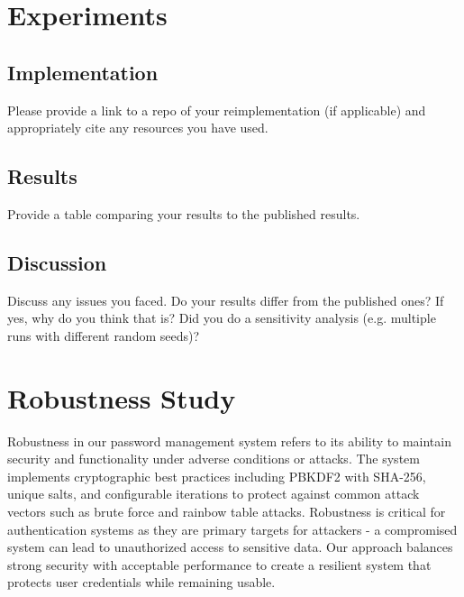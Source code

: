 \documentclass[11pt,a4paper]{article}
\begin{document}
\section{Experiments}

\subsection{Implementation} 
Please provide a link to a repo of your reimplementation (if applicable) and appropriately cite any resources you have used.

\subsection{Results}
Provide a table comparing your results to the published results.

\subsection{Discussion}
Discuss any issues you faced. Do your results differ from the published ones? If yes, why do you think that is? Did you do a sensitivity analysis (e.g. multiple runs with different random seeds)?

\section{Robustness Study}

Robustness in our password management system refers to its ability to maintain security and functionality under adverse conditions or attacks. The system implements cryptographic best practices including PBKDF2 with SHA-256, unique salts, and configurable iterations to protect against common attack vectors such as brute force and rainbow table attacks. Robustness is critical for authentication systems as they are primary targets for attackers - a compromised system can lead to unauthorized access to sensitive data. Our approach balances strong security with acceptable performance to create a resilient system that protects user credentials while remaining usable.
\end{document}
